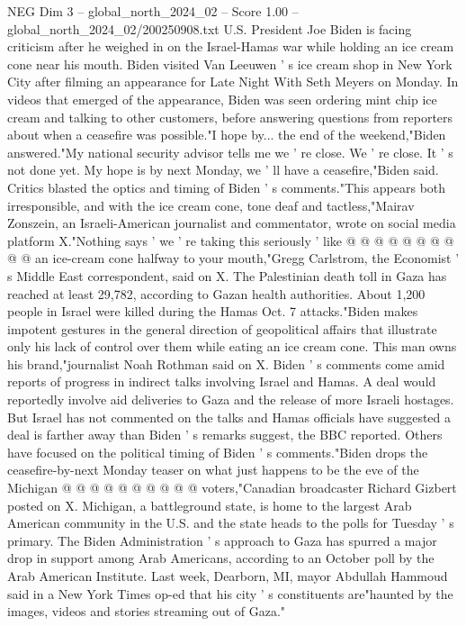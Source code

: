 \begin{textsample}{NEG Dim 3 – global\_north\_2024\_02 – Score 1.00 – global\_north\_2024\_02/200250908.txt}  \label{ex:f3_neg_203}
U.S.
President Joe Biden is facing criticism after he weighed in on the Israel-Hamas war while holding an ice cream cone near his mouth.
Biden visited Van Leeuwen ' s ice cream shop in New York City after filming an appearance for Late Night With Seth Meyers on Monday.
In videos that emerged of the appearance, Biden was seen ordering mint chip ice cream and talking to other customers, before answering questions from reporters about when a ceasefire was possible."I hope by... the end of the weekend,"Biden answered."My national security advisor tells me we ' re close.
We ' re close.
It ' s not done yet.
My hope is by next Monday, we ' ll have a ceasefire,"Biden said.
Critics blasted the optics and timing of Biden ' s comments."This appears both irresponsible, and with the ice cream cone, tone deaf and tactless,"Mairav Zonszein, an Israeli-American journalist and commentator, wrote on social media platform X."Nothing says ' we ' re taking this seriously ' like @ @ @ @ @ @ @ @ @ @ an ice-cream cone halfway to your mouth,"Gregg Carlstrom, the Economist ' s Middle East correspondent, said on X.
The Palestinian death toll in Gaza has reached at least 29,782, according to Gazan health authorities.
About 1,200 people in Israel were killed during the Hamas Oct. 7 attacks."Biden makes impotent gestures in the general direction of geopolitical affairs that illustrate only his lack of control over them while eating an ice cream cone.
This man owns his brand,"journalist Noah Rothman said on X.
Biden ' s comments come amid reports of progress in indirect talks involving Israel and Hamas.
A deal would reportedly involve aid deliveries to Gaza and the release of more Israeli hostages.
But Israel has not commented on the talks and Hamas officials have suggested a deal is farther away than Biden ' s remarks suggest, the BBC reported.
Others have focused on the political timing of Biden ' s comments."Biden drops the ceasefire-by-next Monday teaser on what just happens to be the eve of the Michigan @ @ @ @ @ @ @ @ @ @ voters,"Canadian broadcaster Richard Gizbert posted on X.
Michigan, a battleground state, is home to the largest Arab American community in the U.S. and the state heads to the polls for Tuesday ' s primary.
The Biden Administration ' s approach to Gaza has spurred a major drop in support among Arab Americans, according to an October poll by the Arab American Institute.
Last week, Dearborn, MI, mayor Abdullah Hammoud said in a New York Times op-ed that his city ' s constituents are"haunted by the images, videos and stories streaming out of Gaza."

\end{textsample}
